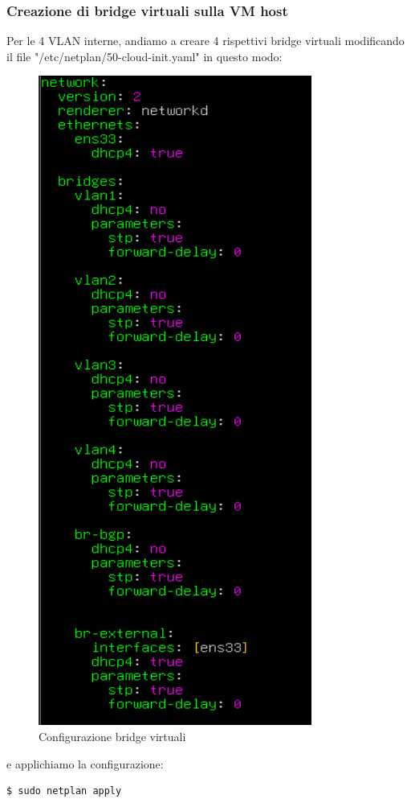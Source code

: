 \documentclass[12pt,a4paper,twoside]{book}
\begin{document}
\subsubsection{Creazione di bridge virtuali sulla VM host}
Per le 4 \ac{VLAN} interne, andiamo a creare 4 rispettivi bridge virtuali modificando il file "/etc/netplan/50-cloud-init.yaml" in questo modo:
\begin{figure}[H]
    \centering
    \includegraphics[scale=0.7]{tesi/img/creazione_bridge_virtuali.png}
    \caption{Configurazione bridge virtuali}
\label{fig:creazione_bridge_virtuali}
\end{figure}
e applichiamo la configurazione:
\begin{lstlisting}[language=bash]
$ sudo netplan apply
\end{lstlisting}
\end{document}
